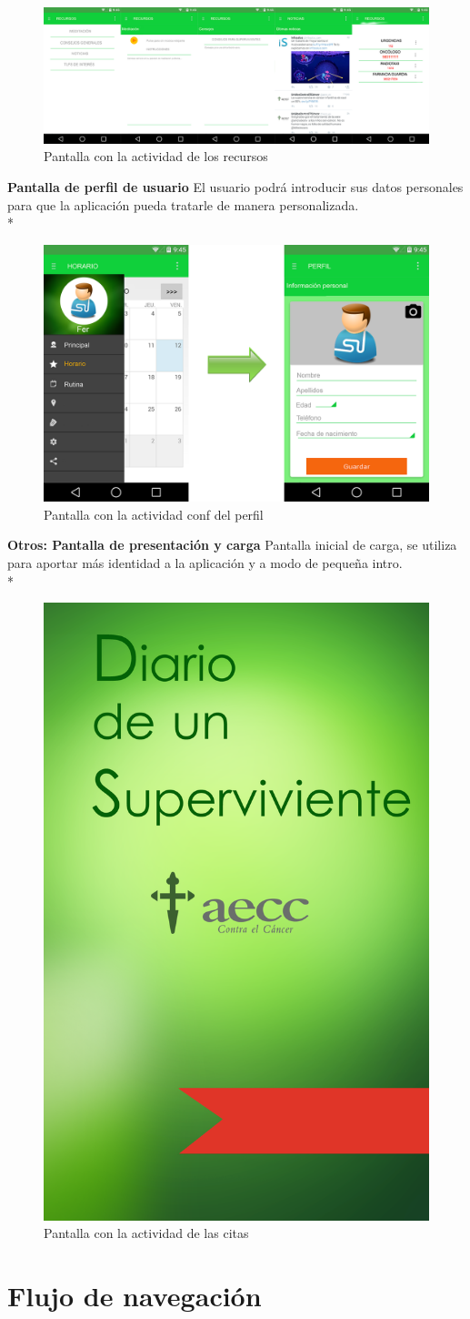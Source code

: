\documentclass[../pfc.tex]{subfiles}
\begin{document}
			\begin{figure}[h]
				\centering
				\includegraphics[width=0.7\linewidth]{../images/recursos}
				\caption{Pantalla con la actividad de los recursos}
				\label{fig:recursos}
			\end{figure}
			
			
			\textbf{Pantalla de perfil de usuario}
			El usuario podrá introducir sus datos personales para que la aplicación pueda tratarle de manera personalizada.\\*
			
			\begin{figure}[h]
				\centering
				\includegraphics[width=0.7\linewidth]{../images/perfil_2}
				\caption{Pantalla con la actividad conf del perfil}
				\label{fig:perfil_2}
			\end{figure}
			
			
			\textbf{Otros: Pantalla de presentación y carga}
			Pantalla inicial de carga, se utiliza para aportar más identidad a la aplicación y a modo de pequeña intro.\\*
			
			\begin{figure}[h]
				\centering
				\includegraphics[width=0.3\linewidth]{../images/flasher_pantalla_carga}
				\caption{Pantalla con la actividad de las citas}
				\label{fig:flasher_pantalla_carga}
			\end{figure}
			
			
		
	\section{Flujo de navegación}
	
	
\end{document}
